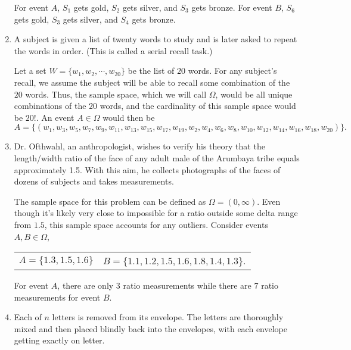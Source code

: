 \documentclass[12pt]{article}
\begin{document}
\begin{center}
\begin{enumerate}[label=(\alph*)]
\noindent
For event $A$, $S_1$ gets gold, $S_2$ gets silver, and $S_3$ gets bronze. For event $B$, $S_6$ gets gold, $S_3$ gets silver,  and $S_4$ gets bronze.

\item A subject is given a list of twenty words to study and is later asked to
repeat the words in order. (This is called a serial recall task.)\\
\vspace{0.3cm}

Let a set $W = \big \{ w_1, w_2, \cdots, w_{20} \big \}$ be the list of $20$ words. For any subject's recall, we assume the subject will be able to recall some combination of the $20$ words. Thus, the sample space, which we will call $\Omega$, would be all unique combinations of the $20$ words, and the cardinality of this sample space would be $20!$. An event $A \in \Omega$ would then be 
\begin{equation*}
A=\big \{ (  w_{1}, w_{3}, w_{5}, w_{7}, w_{9}, w_{11}, w_{13}, w_{15}, w_{17}, w_{19}, w_{2}, w_{4}, w_{6}, w_{8}, w_{10}, w_{12}, w_{14}, w_{16}, w_{18}, w_{20} ) \big \}.
\end{equation*}

\item Dr. Ofthwahl, an anthropologist, wishes to verify his theory that the
length/width ratio of the face of any adult male of the Arumbaya tribe
equals approximately 1.5. With this aim, he collects photographs of the
faces of dozens of subjects and takes measurements.\\
\vspace{0.3cm}

The sample space for this problem can be defined as $\Omega = (0, \infty)$. Even though it's likely very close to impossible for a ratio outside some delta range from $1.5$, this sample space accounts for any outliers. Consider events $A, B \in \Omega$,

\begin{center}
\begin{tabular}{c c}
$A=\big \{ 1.3, 1.5, 1.6  \}$ & $B=\big \{  1.1, 1.2, 1.5, 1.6, 1.8, 1.4, 1.3 \big \}$.\\
\end{tabular}
\end{center}

\noindent
For event $A$, there are only $3$ ratio measurements while there are $7$ ratio measurements for event $B$.

\item Each of $n$ letters is removed from its envelope. The letters are thoroughly mixed and then placed blindly back into the envelopes, with each
envelope getting exactly on letter.\\
\vspace{0.3cm}


\end{enumerate}
\end{center}
\end{document}
